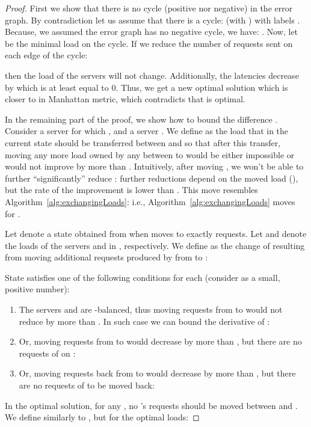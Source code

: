 \documentclass[11pt]{article}
\begin{document}
\begin{proof}
First we show that there is no cycle (positive nor negative) in the error graph. By contradiction let us assume that there is a cycle:  (with ) with labels .
Because, we assumed the error graph has no negative cycle, we have: . 
Now, let  be the minimal load on the cycle. If we reduce the number of requests sent on each edge of the cycle:

then the load of the servers  will not change.
Additionally, the latencies decrease by  which is at least equal to 0. Thus, we get a new optimal solution which is closer to  in Manhattan metric, which contradicts that  is optimal.

In the remaining part of the proof, we show how to bound the difference .
Consider a server  for which , and a server . 
We define as  the load that in the current state  should be transferred between  and  so that after this transfer, moving any  more load owned by any  between  to  would be either impossible or would not improve  by more than . 
Intuitively, after moving , we won't be able to further ``significantly'' reduce : further reductions depend on the moved load (), but the rate of the improvement is lower than . This move resembles Algorithm~\ref{alg:exchangingLoads}: i.e., Algorithm~\ref{alg:exchangingLoads} moves  for .


Let  denote a state obtained from  when  moves to  exactly  requests.
Let  and  denote the loads of the servers  and  in , respectively.
We define  as the change of  resulting from moving additional  requests produced by  from  to :


State  satisfies one of the following conditions for each  (consider  as a small, positive number):
\begin{enumerate}
\item The servers  and  are -balanced, thus moving  requests from  to  would not reduce  by more than . In such case we can bound the derivative of :

\item Or, moving  requests from  to  would decrease  by more than , but there are no requests of  on :

\item Or, moving  requests back from  to  would decrease  by more than , but there are no requests of  to be moved back:

\end{enumerate}

In the optimal solution, for any , no 's requests should be moved between  and . We define  similarly to , but for the optimal loads:


\end{proof}
\end{document}
